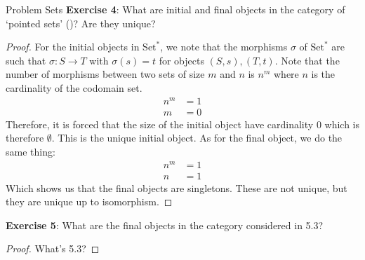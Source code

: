 \documentclass{report}
\begin{document}
\begin{exercises}{Problem Sets}
    \textbf{Exercise 4}: What are initial and final objects in the category of `pointed sets' ()? Are they unique?
        \begin{proof}
            For the initial objects in $\text{Set}^{*}$, we note that the morphisms $\sigma$ of $\text{Set}^{*}$ are such that $\sigma : S \rightarrow T$ with $\sigma(s) = t$ for objects $(S, s), (T, t)$. Note that the number of morphisms between two sets of size $m$ and $n$ is $n^{m}$ where $n$ is the cardinality of the codomain set. 
                \begin{align*}
                    n^{m} & =  1 \\
                    m     & =  0
                \end{align*}
            Therefore, it is forced that the size of the initial object have cardinality $0$ which is therefore $\emptyset$. This is the unique initial object. As for the final object, we do the same thing:
                \begin{align*}
                    n^{m} & =  1 \\
                    n     & =  1   
                \end{align*}
            Which shows us that the final objects are singletons. These are not unique, but they are unique up to isomorphism.
        \end{proof}

    \textbf{Exercise 5}: What are the final objects in the category considered in 5.3?
        \begin{proof}
            What's 5.3?
        \end{proof}


\end{exercises}
\end{document}
